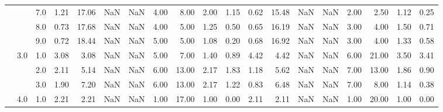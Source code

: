 \begin{tabular}{lllrrrrrrrrrrrrrrrr}
          &     & 7.0  &      1.21 &      17.06 &               NaN &                NaN &  4.00 &   8.00 &             2.00 &                         1.15 &      0.62 &      15.48 &               NaN &                NaN &  2.00 &   2.50 &             1.12 &                         0.25 \\
          &     & 8.0  &      0.73 &      17.68 &               NaN &                NaN &  4.00 &   5.00 &             1.25 &                         0.50 &      0.65 &      16.19 &               NaN &                NaN &  3.00 &   4.00 &             1.50 &                         0.71 \\
          &     & 9.0  &      0.72 &      18.44 &               NaN &                NaN &  5.00 &   5.00 &             1.08 &                         0.20 &      0.68 &      16.92 &               NaN &                NaN &  3.00 &   4.00 &             1.33 &                         0.58 \\
          & 3.0 & 1.0  &      3.08 &       3.08 &               NaN &                NaN &  5.00 &   7.00 &             1.40 &                         0.89 &      4.42 &       4.42 &               NaN &                NaN &  6.00 &  21.00 &             3.50 &                         3.41 \\
          &     & 2.0  &      2.11 &       5.14 &               NaN &                NaN &  6.00 &  13.00 &             2.17 &                         1.83 &      1.18 &       5.62 &               NaN &                NaN &  7.00 &  13.00 &             1.86 &                         0.90 \\
          &     & 3.0  &      1.90 &       7.20 &               NaN &                NaN &  6.00 &  13.00 &             2.17 &                         1.22 &      0.83 &       6.48 &               NaN &                NaN &  7.00 &   8.00 &             1.14 &                         0.38 \\
          & 4.0 & 1.0  &      2.21 &       2.21 &               NaN &                NaN &  1.00 &  17.00 &             1.00 &                         0.00 &      2.11 &       2.11 &               NaN &                NaN &  1.00 &  20.00 &             1.00 &                         0.00 \\
\bottomrule
\end{tabular}

